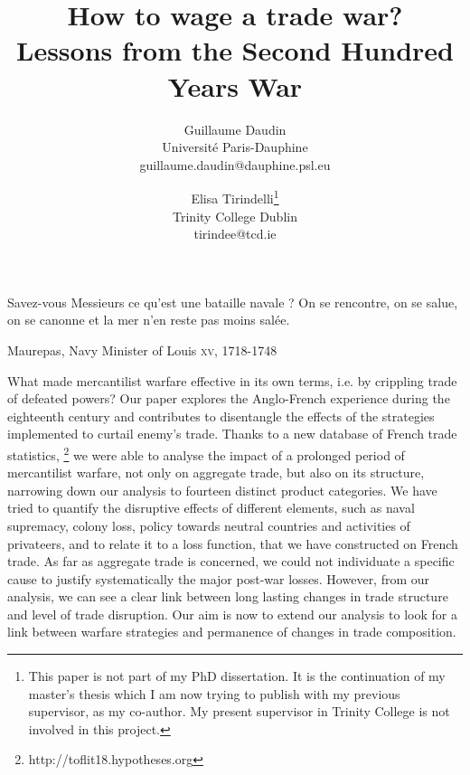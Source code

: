 \documentclass[12pt,a4paper,notitlepage]{article}
\begin{document}
\title{How to wage a trade war? \\
Lessons from the Second Hundred Years War}
\author{
  Guillaume Daudin \\ Université Paris-Dauphine \\guillaume.daudin@dauphine.psl.eu		
  \and
  Elisa Tirindelli\footnote{This paper is not part of my PhD dissertation. It is the continuation of my master's thesis which I am now trying to publish with my previous supervisor, as my co-author. My present supervisor in Trinity College is not involved in this project.} \\ Trinity College Dublin  \\ tirindee@tcd.ie
}
\date{}
\maketitle


\epigraph{Savez-vous Messieurs ce qu’est une bataille navale ? On se rencontre, on se salue, on se canonne et la mer n’en reste pas moins salée.}{Maurepas, Navy Minister of Louis  \textsc{xv}, 1718-1748}


What made mercantilist warfare effective in its own terms, i.e. by crippling trade of defeated powers?
Our paper explores the Anglo-French experience during the eighteenth century and contributes to disentangle the effects of the strategies implemented to curtail enemy's trade. Thanks to a new database of French trade statistics,
\footnote{http://toflit18.hypotheses.org} we were able to analyse the impact of a prolonged period of mercantilist warfare, not only on aggregate trade, but also on its structure, narrowing down our analysis to fourteen distinct product categories. We have tried to quantify the disruptive effects of different elements, such as naval supremacy, colony loss, policy towards neutral countries and activities of privateers, and to relate it to a loss function, that we have constructed on French trade. As far as aggregate trade is concerned, we could not individuate a specific cause to justify systematically the major post-war losses. However, from our analysis, we can see a clear link between long lasting changes in trade structure and level of trade disruption. Our aim is now to extend our analysis to look for a link between warfare strategies and permanence of changes in trade composition.  \\
\end{document}
